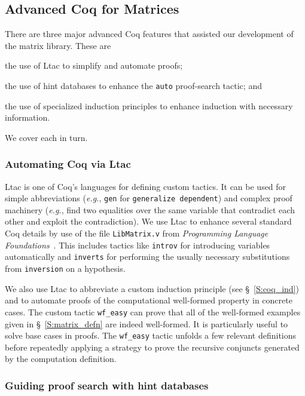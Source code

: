 \documentclass[11pt,conference]{IEEEtran}
\theoremstyle{plain} %
\theoremstyle{definition}
\theoremstyle{remark}
\begin{document}
\subsection{Advanced Coq for Matrices}\label{S:matrix_coq}

There are three major advanced Coq features that assisted our development of the
matrix library. These are
\begin{inlist}
\item the use of Ltac to simplify and automate proofs;
\item the use of hint databases to enhance the \texttt{auto} proof-search
    tactic; and
\item the use of specialized induction principles to enhance induction with
    necessary information.
\end{inlist}
We cover each in turn.

\subsubsection{Automating Coq via Ltac}\label{S:coq_ltac}

Ltac is one of Coq's languages for defining custom tactics. It can be used for
simple abbreviations (\textit{e.g.}, \texttt{gen} for \texttt{generalize dependent}) and
complex proof machinery (\textit{e.g.}, find two equalities over the same
variable that contradict each other and exploit the contradiction). We use Ltac
to enhance several standard Coq details by use of the file \texttt{LibMatrix.v}
from \textit{Programming Language Foundations}~\cite[Chs.\@ \textit{A Collection
of Handy General-Purpose Tactics} and \textit{A Gentle
Introduction}]{Pierce:SF2}. This includes tactics like \texttt{introv} for
introducing variables automatically and \texttt{inverts} for performing the
usually necessary substitutions from \texttt{inversion} on a hypothesis.

We also use Ltac to abbreviate a custom induction principle (see
\S~\ref{S:coq_ind}) and to automate proofs of the computational well-formed
property in concrete cases. The custom tactic \texttt{wf\_easy} can prove that
all of the well-formed examples given in \S~\ref{S:matrix_defn} are indeed
well-formed. It is particularly useful to solve base cases in proofs. The
\texttt{wf\_easy} tactic unfolds a few relevant definitions before repeatedly
applying a strategy to prove the recursive conjuncts generated by the
computation definition.

\subsubsection{Guiding proof search with hint databases}\label{S:coq_hint}
\end{document}
